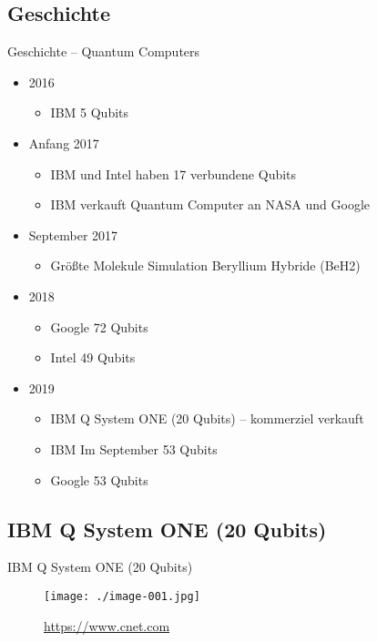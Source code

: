 \documentclass[aspectratio=1610]{beamer}
\begin{document}
\subsection{Geschichte}
\label{sec:org4a63630}

\begin{frame}[label={sec:org8e5df60}]{Geschichte – Quantum Computers}
\begin{itemize}
\item 2016
\begin{itemize}
\item IBM 5 Qubits
\end{itemize}
\item Anfang 2017
\begin{itemize}
\item IBM und Intel haben 17 verbundene Qubits
\item IBM verkauft Quantum Computer an NASA und Google
\end{itemize}
\item September 2017
\begin{itemize}
\item Größte Molekule Simulation Beryllium Hybride (BeH2)
\end{itemize}
\item 2018
\begin{itemize}
\item Google 72 Qubits
\item Intel 49 Qubits
\end{itemize}
\item 2019
\begin{itemize}
\item IBM Q System ONE (20 Qubits) – kommerziel verkauft
\item IBM Im September 53 Qubits
\item Google 53 Qubits
\end{itemize}
\end{itemize}
\end{frame}

\subsection{IBM Q System ONE (20 Qubits)}
\label{sec:orgb5f2e06}

\begin{frame}[label={sec:orge905aec}]{IBM Q System ONE (20 Qubits)}
\begin{figure}[htbp]
\centering
\texttt{[image: ./image-001.jpg]}
\caption{\url{https://www.cnet.com}}
\end{figure}
\end{frame}
\end{document}
